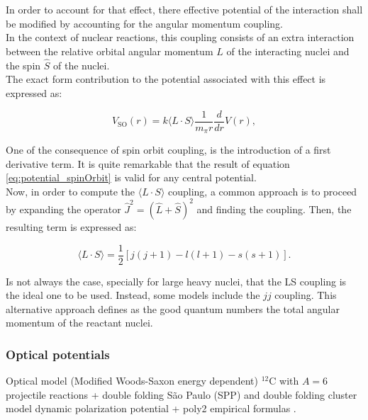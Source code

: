 \documentclass[openany]{book}
\begin{document}
In order to account for that effect, there effective potential of the interaction shall be modified by accounting for the angular momentum coupling. \\

 In the context of nuclear reactions, this coupling consists of an extra interaction between the relative orbital angular momentum $\hat L$ of the interacting nuclei and the spin $\hat S$ of the nuclei. \\

The exact form contribution to the potential associated with this effect is expressed as:

\begin{equation}  \label{eq:potential_spinOrbit}
	V_{\mathrm{SO}}(r) = k\langle L \cdot S \rangle  \frac{1}{m_{\pi}r} \frac{d}{dr} V(r),
\end{equation}

One of the consequence of spin orbit coupling, is the introduction of a first derivative term. It is quite remarkable that the result of equation \ref{eq:potential_spinOrbit} is valid for any central potential.  \\

Now, in order to compute the   $  \langle L \cdot S \rangle$ coupling, a common approach is to proceed by expanding the operator  $\hat J^2 = (\hat L + \hat S)^2$ and finding the coupling. Then, the resulting term is expressed as: 

\begin{equation}  \label{eq:potential_spinOrbit_LSexpansion}
	\langle L \cdot S \rangle =  \frac{1}{2}[j(j+1) - l(l+1) - s(s+1)].
\end{equation}

Is not always the case, specially for large heavy nuclei, that the LS coupling is the ideal one to be used. Instead, some models include the $jj$ coupling. This alternative approach defines as the good quantum numbers the total angular momentum of the reactant nuclei.

\subsubsection{Optical potentials} \label{sub:potential_effective_optical}

Optical model (Modified Woods-Saxon energy dependent) $\mathrm{{}^{12}C}$ with $A = 6$ projectile reactions + double folding São Paulo (SPP)  and double folding cluster model dynamic polarization potential + poly2 empirical formulas \cite{amer_penionzhkevich_2021}. \\
\end{document}
